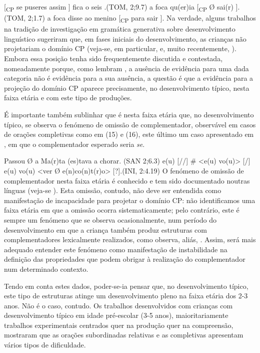 \documentclass[output=paper,colorlinks,citecolor=brown,booklanguage=portuguese]{langscibook}
\begin{document}
\ea
\label{ex:13:12} [\textsubscript{CP} se puseres assim ] fica o seis .\hfill			(TOM, 2;9.7)
    \z
\ea
\label{ex:13:13} a foca qu(er)ia [\textsubscript{CP} Ø   sai(r) ].	\hfill		(TOM, 2;1.7)
    \z
\ea
\label{ex:13:14} a foca disse ao menino [\textsubscript{CP} para sair ].
\z
Na verdade, alguns trabalhos na tradição de investigação em gramática generativa sobre desenvolvimento linguístico sugeriram que, em fases iniciais do desenvolvimento, as crianças não projetariam o domínio CP (veja-se, em particular, \citealp{Radford1988, Radford1996, Clahsen1990/1991, Meisel1992} e, muito recentemente, \citealp{Friedmann2021}). Embora essa posição tenha sido frequentemente discutida e contestada, nomeadamente porque, como lembram \citet{Poeppel1993}, a ausência de evidência para uma dada categoria não é evidência para a sua ausência, a questão é que a evidência para a projeção do domínio CP aparece precisamente, no desenvolvimento típico, nesta faixa etária e com este tipo de produções.  

É importante também sublinhar que é nesta faixa etária que, no desenvolvimento típico, se observa o fenómeno de omissão de complementador, observável em casos de orações completivas como em (15) e (16), este último um caso apresentado em \citet{Santos2017a}, em que o complementador esperado seria \emph{se}.

\ea
    \label{ex:13:15} Passou Ø a Ma(r)ta (es)tava a chorar. (SAN 2;6.3) \citep[365]{Soares2006}
    \z
    \ea
\label{ex:13:16} e(u) [//] \# <e(u) vo(u)> [/] e(u) vo(u) <ver Ø e(n)co(n)t(r)o> [?].\hfill  (INI, 2:4.19)
\z
O fenómeno de omissão de complementador nesta faixa etária é conhecido e tem sido documentado noutras línguas (veja-se \citealp{Meisel1992, Mastropavlou2011}). Esta omissão, contudo, não deve ser entendida como manifestação de incapacidade para projetar o domínio CP: não identificamos uma faixa etária em que a omissão ocorra sistematicamente; pelo contrário, este é sempre um fenómeno que se observa ocasionalmente, num período do desenvolvimento em que a criança também produz estruturas com complementadores lexicalmente realizados, como observa, aliás, \citet{Soares2006}. Assim, será mais adequado entender este fenómeno como manifestação de instabilidade na definição das propriedades que podem obrigar à realização do complementador num determinado contexto.

Tendo em conta estes dados, poder-se-ia pensar que, no desenvolvimento típico, este tipo de estruturas atinge um desenvolvimento pleno na faixa etária dos 2-3 anos. Não é o caso, contudo. Os trabalhos desenvolvidos com crianças com desenvolvimento típico em idade pré-escolar (3-5 anos), maioritariamente trabalhos experimentais centrados quer na produção quer na compreensão, mostraram que as orações subordinadas relativas e as completivas apresentam vários tipos de dificuldade. 
\end{document}
